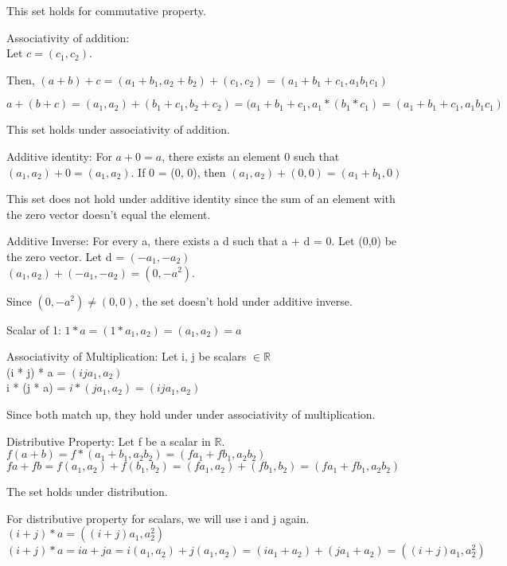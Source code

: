 \documentclass[12pt]{article}
\begin{document}
\begin{enumerate}
        This set holds for commutative property. 

        Associativity of addition: \\
        Let $c = (c_1, c_2)$. 
        
        Then, $(a + b) + c = (a_1 + b_1, a_2 + b_2) + (c_1, c_2) = (a_1 + b_1 + c_1, a_1b_1c_1)$

        $a + (b + c) = (a_1, a_2) + (b_1 + c_1, b_2 + c_2) = (a_1 + b_1 + c_1, a_1*(b_1 * c_1) = (a_1 + b_1 + c_1, a_1b_1c_1)$ 

        This set holds under associativity of addition.
        
        Additive identity:
        For $a + 0 = a$, there exists an element 0 such that $(a_1, a_2) + 0 = (a_1, a_2)$. If 0 = (0, 0), then $(a_1, a_2) + (0, 0) = (a_1 + b_1, 0)$

        This set does not hold under additive identity since the sum of an element with the zero vector doesn't equal the element. 

        Additive Inverse:
        For every a, there exists a d such that a + d = 0. 
        Let (0,0) be the zero vector.
        Let d = $(-a_1, -a_2)$ \\
        $(a_1, a_2) + (-a_1, -a_2) = (0, -a^2)$.

        Since $(0, -a^2) \neq (0,0)$, the set doesn't hold under additive inverse.
        
        Scalar of 1:
        $1 * a = (1 * a_1, a_2) = (a_1, a_2) = a$

        Associativity of Multiplication:
        Let i, j be scalars $\in \mathbb{R}$ \\
        (i * j) * a = $(ija_1, a_2)$ \\
        i * (j * a) = $i * (ja_1, a_2) = (ija_1, a_2)$
        
        Since both match up, they hold under under associativity of multiplication. 

        Distributive Property: 
        Let f be a scalar in $\mathbb{R}$. 
        $f(a + b) = f * (a_1 + b_1, a_2b_2) = (fa_1 + fb_1, a_2b_2)$ 
        $fa + fb = f(a_1, a_2) + f(b_1, b_2) = (fa_1, a_2) + (fb_1, b_2) = (fa_1 + fb_1, a_2b_2)$

        The set holds under distribution.

        For distributive property for scalars, we will use i and j again. \\
        $(i + j) * a = ((i + j)a_1, a_2^2)$ \\
        $(i + j) * a = ia + ja = i(a_1, a_2) + j(a_1, a_2) = (ia_1 + a_2) + (ja_1 + a_2) = ((i + j)a_1, a_2^2)$ 


\end{enumerate}
\end{document}
